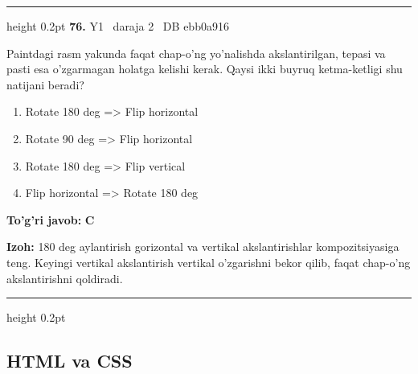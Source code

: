 \documentclass[10pt,a4paper,oneside]{article}
\begin{document}
\vspace{2mm}\hrule height 0.2pt \vspace{4mm}
\hypertarget{q76}{\textbf{\color{ink}76.}}  {\color{muted}\scriptsize Y1 \textbullet\ daraja 2 \textbullet\ DB ebb0a916}
\par
Paintdagi rasm yakunda faqat chap-o'ng yo'nalishda akslantirilgan, tepasi va pasti esa o'zgarmagan holatga kelishi kerak. Qaysi ikki buyruq ketma-ketligi shu natijani beradi?
\begin{enumerate}[label=\Alph*),leftmargin=9mm]
\item Rotate 180 deg  =\textgreater{} Flip horizontal
\item Rotate 90 deg  =\textgreater{} Flip horizontal
\item Rotate 180 deg  =\textgreater{} Flip vertical
\item Flip horizontal =\textgreater{} Rotate 180 deg 
\end{enumerate}
\begin{tcolorbox}[enhanced,breakable,colback=teal!4,colframe=teal!45!black,boxrule=0.45pt,arc=1.2mm,left=2.8mm,right=2.8mm,top=2mm,bottom=2mm,before skip=2mm,after skip=2mm]
\textbf{\color{teal}To'g'ri javob:} \textbf{C}
\par\smallskip
\textbf{Izoh:} 180 deg  aylantirish gorizontal va vertikal akslantirishlar kompozitsiyasiga teng. Keyingi vertikal akslantirish vertikal o'zgarishni bekor qilib, faqat chap-o'ng akslantirishni qoldiradi.
\end{tcolorbox}
\vspace{2mm}\hrule height 0.2pt \vspace{4mm}
\subsection{HTML va CSS}
\end{document}
